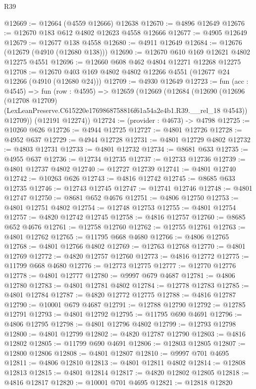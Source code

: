\begin{lexlean}{R39}
\begin{coremodule}
@12669 := @12664 (@4559 @12666) @12638
@12670 := @4896 @12649
@12676 := @12670 @183 @612 @4802 @12623 @4558 @12666
@12677 := @4905 @12649
@12679 := @12677 @138 @4558
@12680 := @4911 @12649
@12684 := @12676 (@12679 (@4910 (@12680 @138)))
@12690 := @12670 @610 @169 @12621 @4802 @12275 @4551
@12696 := @12660 @608 @462 @4804 @12271 @12268 @12275
@12708 := @12670 @403 @169 @4802 @4802 @12266 @4551 (@12677 @24 @12266 (@4910 (@12680 @24)))
@12709 := @4930 @12649
@12723 := fun (acc : @4545) =>
  fun (row : @4595) =>
  @12659
    (@12669
      (@12684
        (@12690
          (@12696
            (@12708 @12709)
            (LexLeanPreserve.C615220e1769868758816f61a54a2e4b1.R39.__rel_18 @4543))
          @12709))
      (@12191 @12274))
@12724 := (provider : @4673) -> @4798
@12725 := @10260 @626
@12726 := @4944 @12725
@12727 := @4801 @12726
@12728 := @4952 @637
@12729 := @4944 @12728
@12731 := @4801 @12729 @4802
@12732 := @4803 @12731
@12733 := @4801 @12732
@12734 := @8681 @633
@12735 := @4955 @637
@12736 := @12734 @12735
@12737 := @12733 @12736
@12739 := @4801 @12737 @4802
@12740 := @12727 @12739
@12741 := @4801 @12740
@12742 := @10263 @626
@12743 := @4816 @12742
@12745 := @8685 @633 @12735
@12746 := @12743 @12745
@12747 := @12741 @12746
@12748 := @4801 @12747
@12750 := @8681 @652 @4676
@12751 := @4806 @12750
@12753 := @4801 @12751 @4802
@12754 := @12748 @12753
@12755 := @4801 @12754
@12757 := @4820 @12742 @12745
@12758 := @4816 @12757
@12760 := @8685 @652 @4676
@12761 := @12758 @12760
@12762 := @12755 @12761
@12763 := @4801 @12762
@12765 := @11795 @668 @4680
@12766 := @4806 @12765
@12768 := @4801 @12766 @4802
@12769 := @12763 @12768
@12770 := @4801 @12769
@12772 := @4820 @12757 @12760
@12773 := @4816 @12772
@12775 := @11799 @668 @4680
@12776 := @12773 @12775
@12777 := @12770 @12776
@12778 := @4801 @12777
@12780 := @9997 @679 @4687
@12781 := @4806 @12780
@12783 := @4801 @12781 @4802
@12784 := @12778 @12783
@12785 := @4801 @12784
@12787 := @4820 @12772 @12775
@12788 := @4816 @12787
@12790 := @10001 @679 @4687
@12791 := @12788 @12790
@12792 := @12785 @12791
@12793 := @4801 @12792
@12795 := @11795 @690 @4691
@12796 := @4806 @12795
@12798 := @4801 @12796 @4802
@12799 := @12793 @12798
@12800 := @4801 @12799
@12802 := @4820 @12787 @12790
@12803 := @4816 @12802
@12805 := @11799 @690 @4691
@12806 := @12803 @12805
@12807 := @12800 @12806
@12808 := @4801 @12807
@12810 := @9997 @701 @4695
@12811 := @4806 @12810
@12813 := @4801 @12811 @4802
@12814 := @12808 @12813
@12815 := @4801 @12814
@12817 := @4820 @12802 @12805
@12818 := @4816 @12817
@12820 := @10001 @701 @4695
@12821 := @12818 @12820

\end{coremodule}
\end{lexlean}
